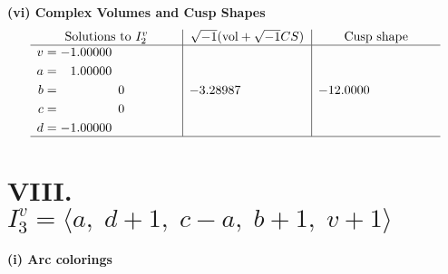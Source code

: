 \documentclass[1p]{elsarticle_modified}
\theoremstyle{definition}
\newcommand{\I}{\sqrt{-1}}
\begin{document}
\newpage\flushleft \textbf{(vi) Complex Volumes and Cusp Shapes}
$$\begin{array}{c|c|c}  
\text{Solutions to }I^v_{2}& \I (\text{vol} + \sqrt{-1}CS) & \text{Cusp shape}\\
 \hline 
\begin{aligned}
v &= -1.00000\phantom{ +0.000000I} \\
a &= \phantom{-}1.00000\phantom{ +0.000000I} \\
b &= \phantom{-0.000000 } 0 \\
c &= \phantom{-0.000000 } 0 \\
d &= -1.00000\phantom{ +0.000000I}\end{aligned}
 & -3.28987\phantom{ +0.000000I} & -12.0000\phantom{ +0.000000I}\\
 \hline 
 \end{array}$$\newpage\newpage\renewcommand{\arraystretch}{1}
\centering \section*{VIII. $I^v_{3}= \langle a,\;d+1,\;c- a,\;b+1,\;v+1 \rangle$}
\flushleft \textbf{(i) Arc colorings}\\
\end{document}
